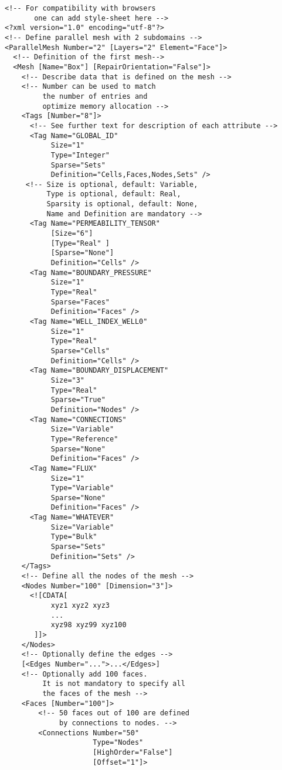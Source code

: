 \documentclass[14pt]{article}
\begin{document}
\begin{lstlisting}
<!-- For compatibility with browsers 
       one can add style-sheet here -->
<?xml version="1.0" encoding="utf-8"?>
<!-- Define parallel mesh with 2 subdomains -->
<ParallelMesh Number="2" [Layers="2" Element="Face"]>
  <!-- Definition of the first mesh--> 
  <Mesh [Name="Box"] [RepairOrientation="False"]>
    <!-- Describe data that is defined on the mesh -->
    <!-- Number can be used to match 
         the number of entries and
         optimize memory allocation -->
    <Tags [Number="8"]>
      <!-- See further text for description of each attribute -->
      <Tag Name="GLOBAL_ID" 
           Size="1" 
           Type="Integer" 
           Sparse="Sets" 
           Definition="Cells,Faces,Nodes,Sets" />
     <!-- Size is optional, default: Variable,
          Type is optional, default: Real,
          Sparsity is optional, default: None,
          Name and Definition are mandatory -->
      <Tag Name="PERMEABILITY_TENSOR" 
           [Size="6"] 
           [Type="Real" ]
           [Sparse="None"] 
           Definition="Cells" />
      <Tag Name="BOUNDARY_PRESSURE" 
           Size="1" 
           Type="Real" 
           Sparse="Faces" 
           Definition="Faces" />
      <Tag Name="WELL_INDEX_WELL0" 
           Size="1" 
           Type="Real" 
           Sparse="Cells" 
           Definition="Cells" />
      <Tag Name="BOUNDARY_DISPLACEMENT" 
           Size="3" 
           Type="Real" 
           Sparse="True" 
           Definition="Nodes" />
      <Tag Name="CONNECTIONS"
           Size="Variable"
           Type="Reference"
           Sparse="None"
           Definition="Faces" />
      <Tag Name="FLUX"
           Size="1"
           Type="Variable"
           Sparse="None"
           Definition="Faces" />
      <Tag Name="WHATEVER"
           Size="Variable"
           Type="Bulk"
           Sparse="Sets"
           Definition="Sets" />
    </Tags>
    <!-- Define all the nodes of the mesh -->
    <Nodes Number="100" [Dimension="3"]>
      <![CDATA[ 
           xyz1 xyz2 xyz3 
           ... 
           xyz98 xyz99 xyz100 
       ]]>
    </Nodes>
    <!-- Optionally define the edges -->
    [<Edges Number="...">...</Edges>]
    <!-- Optionally add 100 faces.
         It is not mandatory to specify all 
         the faces of the mesh -->
    <Faces [Number="100"]>
        <!-- 50 faces out of 100 are defined 
             by connections to nodes. -->
        <Connections Number="50" 
                     Type="Nodes" 
                     [HighOrder="False"]
                     [Offset="1"]> 

\end{lstlisting}
\end{document}
